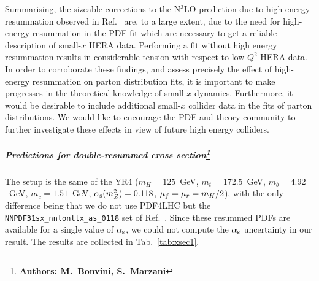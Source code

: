 Summarising, the sizeable corrections to the N$^3$LO prediction due to
high-energy resummation observed in Ref.~\cite{Bonvini:2018ixe} are,
to a large extent, due to the need for high-energy resummation in the
PDF fit which are necessary to get a reliable description of small-$x$
HERA data.  Performing a fit without high energy resummation results
in considerable tension with respect to low $Q^2$ HERA data.  In order
to corroborate these findings, and assess precisely the effect of
high-energy resummation on parton distribution fits, it is important
to make progresses in the theoretical knowledge of small-$x$
dynamics. Furthermore, it would be desirable to include additional
small-$x$ collider data in the fits of parton distributions.  We would
like to encourage the PDF and theory community to further investigate
these effects in view of future high energy colliders.



\subparagraph{Predictions for double-resummed cross
  section\footnote{\bf Authors: M.~Bonvini, S.~Marzani}}

The setup is the same of the YR4 ($m_H=125$~GeV, $m_t=172.5$~GeV,
$m_b=4.92$~GeV, $m_c=1.51$~GeV, $\alpha_\text{s}(m_Z^2)=0.118$,
$\mu_f=\mu_r=m_H/2$), with the only difference being that we do not use
PDF4LHC but the \verb+NNPDF31sx_nnlonllx_as_0118+ set of
Ref.~\cite{Ball:2017otu}.  Since these resummed PDFs are available for
a single value of $\alpha_\text{s}$, we could not compute the $\alpha_\text{s}$ uncertainty in
our result. The results are collected in Tab.~\ref{tab:xsec1}.

